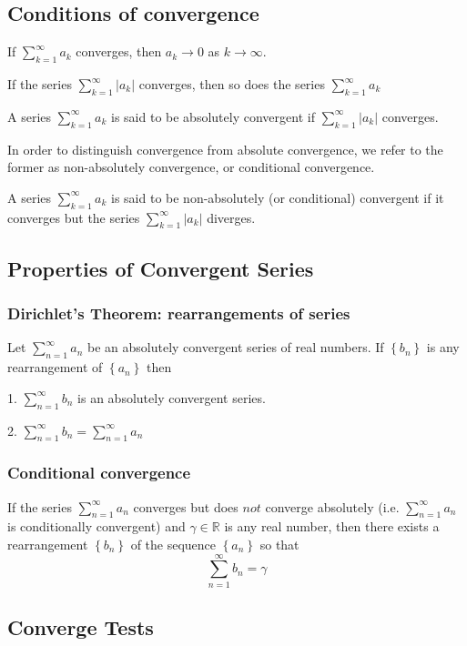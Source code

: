 \documentclass[11pt]{article}
\begin{document}
\subsection{Conditions of convergence}

If $\sum_{k=1}^{\infty} a_{k}$ converges, then $a_{k} \rightarrow 0$ as $k \rightarrow \infty$.

If the series $\sum_{k=1}^{\infty}\left|a_{k}\right|$ converges, then so does the series $\sum_{k=1}^{\infty}a_{k}$


A series $\sum_{k=1}^{\infty} a_{k}$ is said to be absolutely convergent if $\sum_{k=1}^{\infty}\left|a_{k}\right|$ converges.


In order to distinguish convergence from absolute convergence, we refer to the former as non-absolutely convergence, or conditional convergence.


A series $\sum_{k=1}^{\infty} a_{k}$ is said to be non-absolutely (or conditional) convergent if it converges but the series $\sum_{k=1}^{\infty}\left|a_{k}\right|$ diverges.

\subsection{Properties of Convergent Series}
\subsubsection{Dirichlet's Theorem: rearrangements of series}

Let $\sum_{n=1}^{\infty} a_{n}$ be an absolutely convergent series of real numbers. If $\left\{b_{n}\right\}$ is any rearrangement of $\left\{a_{n}\right\}$ then

1. $\sum_{n=1}^{\infty} b_{n}$ is an absolutely convergent series.

2. $\sum_{n=1}^{\infty} b_{n}=\sum_{n=1}^{\infty} a_{n}$

\subsubsection{Conditional convergence}
If the series $\sum_{n=1}^{\infty} a_{n}$ converges but does $n o t$ converge absolutely (i.e. $\sum_{n=1}^{\infty} a_{n}$ is conditionally convergent) and $\gamma \in \mathbb{R}$ is any real number, then there exists a rearrangement $\left\{b_{n}\right\}$ of the sequence $\left\{a_{n}\right\}$ so that
$$
\sum_{n=1}^{\infty} b_{n}=\gamma
$$

\subsection{Converge Tests}
\end{document}
